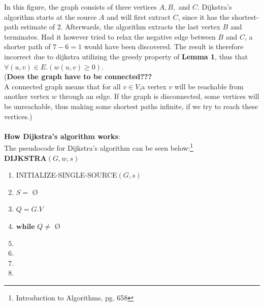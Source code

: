 \documentclass[11pt]{article}
\begin{document}
\noindent In this figure, the graph consists of three vertices $A, B,$ and $C$. Dijkstra's algorithm starts at the source $A$ and will first extract $C$, since it has the shortest-path estimate of 2. Afterwards, the algorithm extracts the last vertex $B$ and terminates. Had it however tried to relax the negative edge between $B$ and $C$, a shorter path of $7 - 6 = 1$ would have been discovered. The result is therefore incorrect due to dijkstra utilizing the greedy property of \textbf{Lemma 1}, thus that $\forall (u,v) \in E.(w(u,v) \geq 0)$. \\

\noindent
(\textbf{Does the graph have to be connected???}\\
A connected graph means that for all $v \in V $,a vertex $v$ will be reachable from another vertex $w$ through an edge. If the graph is disconnected, some vertices will be unreachable, thus making some shortest paths infinite, if we try to reach these vertices.)\\\\


\noindent
\textbf{How Dijkstra's algorithm works}:\\
The pseudocode for Dijkstra's algorithm can be seen below:\footnote{Introduction to Algorithms, pg. 658}\\

\textbf{DIJKSTRA$(G, w, s)$}
\begin{enumerate}
\setlength\itemsep{0em}
\item INITIALIZE-SINGLE-SOURCE$(G, s)$
\item $S = $ \O
\item $Q = G.V$
\item $\textbf{while } Q \neq$ \O
\item {}
\item {}
\item {}
\item \tab{}
\end{enumerate}
\end{document}
